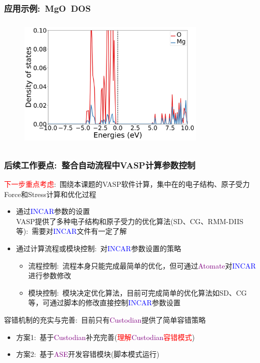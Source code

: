 \documentclass[cjk,slidestop,handout,compress,mathserif,blue]{beamer}	%
\begin{document}
\frame
{
	\frametitle{应用示例:~\textrm{MgO~DOS}}
\begin{figure}[h!]
\centering
\vspace*{-0.1in}
\includegraphics[height=2.5in,width=3.5in,viewport=0 0 900 600,clip]{Figures/Atomate_MgO-DOS.png}\\
\label{Atomate_MgO-DOS}
\end{figure} 
}

\frame
{
	\frametitle{后续工作要点:~整合自动流程中\textrm{VASP}计算参数控制}
	\textcolor{red}{下一步重点考虑}:~围绕本课题的\textrm{VASP}软件计算，集中在的电子结构、原子受力\textrm{Force}和\textrm{Stress}计算和优化过程
	\begin{itemize}
		\item 通过\textcolor{blue}{\textrm{INCAR}}参数的设置\\
			\textrm{VASP}提供了多种电子结构和原子受力的优化算法(\textrm{SD}、\textrm{CG}、\textrm{RMM-DIIS}等):~需要对\textcolor{blue}{\textrm{INCAR}}文件有一定了解
		\item 通过计算流程或模块控制:~对\textcolor{blue}{\textrm{INCAR}}参数设置的策略
			\begin{itemize}
				\item 流程控制:~流程本身只能完成最简单的优化，但可通过\textcolor{purple}{\textrm{Atomate}}对\textcolor{blue}{\textrm{INCAR}}进行参数修改
				\item 模块控制:~模块决定优化算法，目前可完成简单的优化算法如\textrm{SD}、\textrm{CG}等，可通过脚本的修改直接控制\textcolor{blue}{\textrm{INCAR}}参数设置
			\end{itemize}
	\end{itemize}
	 容错机制的充实与完善:~目前只有\textcolor{purple}{\textrm{Custodian}}提供了简单容错策略
	 \begin{itemize}
		 \item 方案1:~基于\textcolor{purple}{\textrm{Custodian}}补充完善(\textcolor{red}{理解\textcolor{purple}{\textrm{Custodian}}容错模式})
		 \item 方案2:~基于\textcolor{purple}{\textrm{ASE}}开发容错模块(脚本模式运行)
	 \end{itemize}
}
\end{document}
